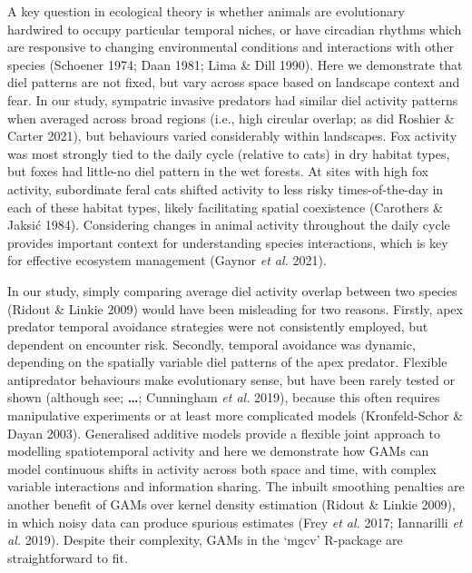 \documentclass[11pt,a4paper,titlepage,twoside,openright]{style/unimelbthesis}
\begin{document}
\begin{mainmatter}
A key question in ecological theory is whether animals are evolutionary hardwired to occupy particular temporal niches, or have circadian rhythms which are responsive to changing environmental conditions and interactions with other species (Schoener 1974; Daan 1981; Lima \& Dill 1990). Here we demonstrate that diel patterns are not fixed, but vary across space based on landscape context and fear. In our study, sympatric invasive predators had similar diel activity patterns when averaged across broad regions (i.e., high circular overlap; as did Roshier \& Carter 2021), but behaviours varied considerably within landscapes. Fox activity was most strongly tied to the daily cycle (relative to cats) in dry habitat types, but foxes had little-no diel pattern in the wet forests. At sites with high fox activity, subordinate feral cats shifted activity to less risky times-of-the-day in each of these habitat types, likely facilitating spatial coexistence (Carothers \& Jaksić 1984). Considering changes in animal activity throughout the daily cycle provides important context for understanding species interactions, which is key for effective ecosystem management (Gaynor \emph{et al.} 2021).

In our study, simply comparing average diel activity overlap between two species (Ridout \& Linkie 2009) would have been misleading for two reasons. Firstly, apex predator temporal avoidance strategies were not consistently employed, but dependent on encounter risk. Secondly, temporal avoidance was dynamic, depending on the spatially variable diel patterns of the apex predator. Flexible antipredator behaviours make evolutionary sense, but have been rarely tested or shown (although see; \textbf{\ldots{}}; Cunningham \emph{et al.} 2019), because this often requires manipulative experiments or at least more complicated models (Kronfeld-Schor \& Dayan 2003). Generalised additive models provide a flexible joint approach to modelling spatiotemporal activity and here we demonstrate how GAMs can model continuous shifts in activity across both space and time, with complex variable interactions and information sharing. The inbuilt smoothing penalties are another benefit of GAMs over kernel density estimation (Ridout \& Linkie 2009), in which noisy data can produce spurious estimates (Frey \emph{et al.} 2017; Iannarilli \emph{et al.} 2019). Despite their complexity, GAMs in the `mgcv' R-package are straightforward to fit.


\end{mainmatter}
\end{document}
